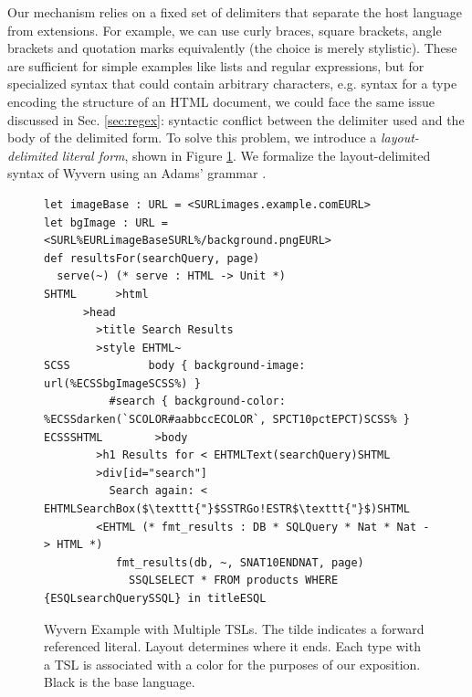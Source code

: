 \begin{contribution}\label{cont:layout-delimited-literals}
Our mechanism relies on a fixed set of delimiters that separate the host language from extensions. For example, we can use curly braces, square brackets, angle brackets and quotation marks equivalently (the choice is merely stylistic). These are sufficient for simple examples like lists and regular expressions, but for specialized syntax that could contain arbitrary characters, e.g. syntax for a type encoding the structure of an HTML document, we could face the same issue discussed in Sec. \ref{sec:regex}: syntactic conflict between the delimiter used and the body of the delimited form. To solve this problem, we introduce a \emph{layout-delimited literal form}, shown in Figure \ref{fig:html}. We formalize the layout-delimited syntax of Wyvern using an Adams' grammar \cite{Adams:2013:PPI:2429069.2429129}.

\begin{figure}[t]
\begin{lstlisting}
let imageBase : URL = <SURLimages.example.comEURL>
let bgImage : URL = <SURL%EURLimageBaseSURL%/background.pngEURL>
def resultsFor(searchQuery, page)
  serve(~) (* serve : HTML -> Unit *)
SHTML      >html
      >head
        >title Search Results
        >style EHTML~
SCSS            body { background-image: url(%ECSSbgImageSCSS%) }
          #search { background-color: %ECSSdarken(`SCOLOR#aabbccECOLOR`, SPCT10pctEPCT)SCSS% }
ECSSSHTML        >body
        >h1 Results for < EHTMLText(searchQuery)SHTML
        >div[id="search"]
          Search again: < EHTMLSearchBox($\texttt{"}$SSTRGo!ESTR$\texttt{"}$)SHTML
        <EHTML (* fmt_results : DB * SQLQuery * Nat * Nat -> HTML *)
           fmt_results(db, ~, SNAT10ENDNAT, page)
             SSQLSELECT * FROM products WHERE {ESQLsearchQuerySSQL} in titleESQL
\end{lstlisting}
\caption{Wyvern Example with Multiple TSLs. The tilde indicates a forward referenced literal. Layout determines where it ends. Each type with a TSL is associated with a color for the purposes of our exposition. Black is the base language.}
\label{fig:html}
\end{figure}\end{contribution}





